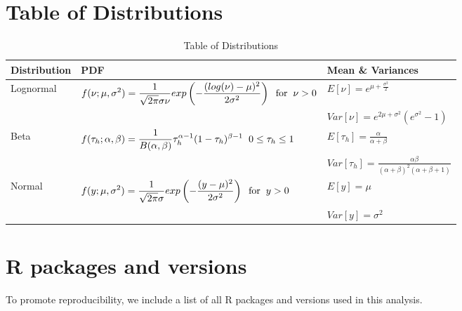 \documentclass[oneside,12pt,final]{sty/ucthesis-CA2012}
\begin{document}
\begin{mainmatter}
\section{Table of Distributions}
\begin{table}
\caption{Table of Distributions}
\begin{tabular}{l|l|l}
  \hline \small
 Distribution & PDF & Mean \& Variances \\ 
   \hline
   Lognormal & \(\displaystyle f(\nu;\mu,\sigma^2) = \frac{1}{\sqrt{2\pi}\sigma \nu}exp\left( -\frac{(log(\nu)-\mu)^2}{2\sigma^2} \right) \hspace{2mm} \text{for} \hspace{2mm} \nu > 0 \) & \(\displaystyle E[\nu] = e^{\mu + \frac{\sigma^2}{2}} \) \\
      & &  \(\displaystyle Var[\nu] =  e^{2\mu + \sigma^2}(e^{\sigma^2} - 1) \) \\
   \hline
   Beta & \(\displaystyle f(\tau_{h};\alpha,\beta) = \frac{1}{B(\alpha, \beta)} \tau_{h}^{\alpha -1} (1-\tau_{h})^{\beta -1}  \hspace{2mm} 0 \leq \tau_{h} \leq 1   \) &  \(\displaystyle E[\tau_{h}] = \frac{\alpha}{\alpha + \beta} \) \\
	   & &  \(\displaystyle Var[{\tau_{h}}] = \frac{\alpha\beta}{(\alpha + \beta)^2(\alpha + \beta + 1)} \) \\  	
   \hline
      Normal &  \(\displaystyle f(y;\mu,\sigma^2) = \frac{1}{\sqrt{2\pi}\sigma }exp\left( -\frac{(y-\mu)^2}{2\sigma^2} \right) \hspace{2mm} \text{for} \hspace{2mm} y > 0 \) & \(\displaystyle E[y] =\mu \) \\
      & &  \(\displaystyle Var[y] =  \sigma^2 \) \\
\end{tabular} 
\label{distributions_a3}
\end{table}

\newpage

\section{R packages and versions}
To promote reproducibility, we include a list of all R packages and versions used in this analysis.


\end{mainmatter}
\end{document}
